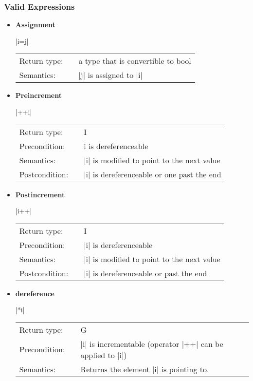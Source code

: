 \documentclass[12pt,twoside]{report}
\newcommand{\bool}{a type that is convertible to bool}
\begin{document}
\htmlrule[CLEAR=all]  \subsubsection*{Valid Expressions}
\begin{itemize}

  \item {\bf Assignment}
    
    |i=j|
    
    \begin{tabular}[!h]{l p{1cm} p{10cm}}
      Return type: & & \bool \\
      Semantics: & & |j| is assigned to |i|\\
    \end{tabular}

  
\item {\bf Preincrement}

  |++i|

  \begin{tabular}[!h]{l p{1cm} p{10cm}}
    Return type: & & I\\
    Precondition: & & i is dereferenceable\\
    Semantics: & & |i| is modified to point to the next value\\
    Postcondition: & & |i| is dereferenceable or one past the end\\
  \end{tabular}


\item {\bf Postincrement}

  |i++|

  \begin{tabular}[!h]{l p{1cm} p{10cm}}
    Return type: & & I\\
    Precondition: & & |i| is dereferenceable\\
    Semantics: & & |i| is modified to point to the next value\\
    Postcondition: & & |i| is dereferenceable or past the end\\
  \end{tabular}



\item {\bf dereference}

  |*i|

  \begin{tabular}[!h]{l p{1cm} p{10cm}}
    Return type: & & G\\
    Precondition: & & |i| is incrementable (operator |++| can be applied to |i|)\\
    Semantics: & & Returns the element |i| is pointing to.\\
  \end{tabular}



\end{itemize}
\end{document}
